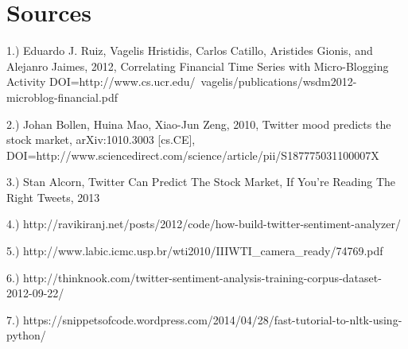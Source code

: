 \documentclass{acm_proc_article-sp}
\begin{document}
\section{Sources}

1.) Eduardo J. Ruiz, Vagelis Hristidis, Carlos Catillo, Aristides Gionis, and
Alejanro Jaimes,  2012, Correlating Financial Time Series with Micro-Blogging
Activity DOI=http://www.cs.ucr.edu/~vagelis/publications/wsdm2012-microblog-financial.pdf 

2.) Johan Bollen, Huina Mao, Xiao-Jun Zeng, 2010, Twitter mood predicts the stock
market, arXiv:1010.3003 [cs.CE], DOI=http://www.sciencedirect.com/science/article/pii/S187775031100007X


3.) Stan Alcorn, Twitter Can Predict The Stock Market, If You're Reading The Right
Tweets, 2013

4.) http://ravikiranj.net/posts/2012/code/how-build-twitter-sentiment-analyzer/

5.) http://www.labic.icmc.usp.br/wti2010/IIIWTI\_camera\_ready/74769.pdf

6.) http://thinknook.com/twitter-sentiment-analysis-training-corpus-dataset-2012-09-22/

7.) https://snippetsofcode.wordpress.com/2014/04/28/fast-tutorial-to-nltk-using-python/

 
\end{document}
